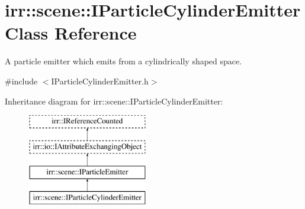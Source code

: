 \hypertarget{classirr_1_1scene_1_1IParticleCylinderEmitter}{}\section{irr\+:\+:scene\+:\+:I\+Particle\+Cylinder\+Emitter Class Reference}
\label{classirr_1_1scene_1_1IParticleCylinderEmitter}


A particle emitter which emits from a cylindrically shaped space.  




{\ttfamily \#include $<$I\+Particle\+Cylinder\+Emitter.\+h$>$}

Inheritance diagram for irr\+:\+:scene\+:\+:I\+Particle\+Cylinder\+Emitter\+:\begin{figure}[H]
\begin{center}
\leavevmode
\includegraphics[height=4.000000cm]{classirr_1_1scene_1_1IParticleCylinderEmitter}
\end{center}
\end{figure}
